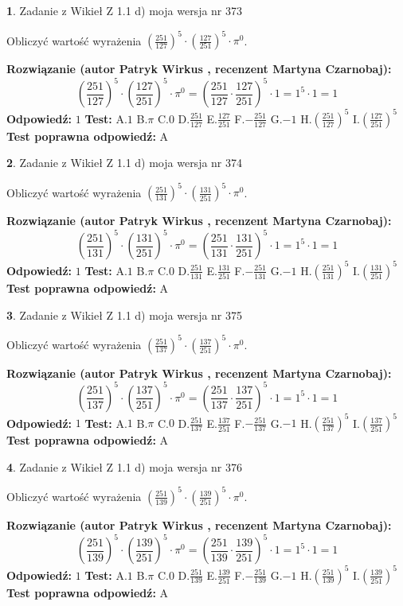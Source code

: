 \documentclass[12pt, a4paper]{article}
\theoremstyle{definition} %
\newtheorem{zad}{}
\newcommand{\zadStart}[1]{\begin{zad}#1\newline}
\newcommand{\zadStop}{\end{zad}}
\newcommand{\rozwStart}[2]{\noindent \textbf{Rozwiązanie (autor #1 , recenzent #2): }\newline}
\newcommand{\rozwStop}{\newline}
\newcommand{\odpStart}{\noindent \textbf{Odpowiedź:}\newline}
\newcommand{\odpStop}{\newline}
\newcommand{\testStart}{\noindent \textbf{Test:}\newline}
\newcommand{\testStop}{\newline}
\newcommand{\kluczStart}{\noindent \textbf{Test poprawna odpowiedź:}\newline}
\newcommand{\kluczStop}{\newline}
\begin{document}
\zadStart{Zadanie z Wikieł Z 1.1 d) moja wersja nr 373}

Obliczyć wartość wyrażenia $(\frac{251}{127})^{5} \cdot (\frac{127}{251})^{5} \cdot \pi^{0}$.
\zadStop
\rozwStart{Patryk Wirkus}{Martyna Czarnobaj}
$$(\frac{251}{127})^{5} \cdot (\frac{127}{251})^{5} \cdot \pi^{0} = (\frac{251}{127} \cdot \frac{127}{251})^{5} \cdot 1 = 1^{5} \cdot 1 = 1$$
\rozwStop
\odpStart
$1$
\odpStop
\testStart
A.$1$ B.$\pi$ C.$0$ D.$\frac{251}{127}$ E.$\frac{127}{251}$
F.$-\frac{251}{127}$ G.$-1$
H.$(\frac{251}{127})^{5}$
I.$(\frac{127}{251})^{5}$
\testStop
\kluczStart
A
\kluczStop



\zadStart{Zadanie z Wikieł Z 1.1 d) moja wersja nr 374}

Obliczyć wartość wyrażenia $(\frac{251}{131})^{5} \cdot (\frac{131}{251})^{5} \cdot \pi^{0}$.
\zadStop
\rozwStart{Patryk Wirkus}{Martyna Czarnobaj}
$$(\frac{251}{131})^{5} \cdot (\frac{131}{251})^{5} \cdot \pi^{0} = (\frac{251}{131} \cdot \frac{131}{251})^{5} \cdot 1 = 1^{5} \cdot 1 = 1$$
\rozwStop
\odpStart
$1$
\odpStop
\testStart
A.$1$ B.$\pi$ C.$0$ D.$\frac{251}{131}$ E.$\frac{131}{251}$
F.$-\frac{251}{131}$ G.$-1$
H.$(\frac{251}{131})^{5}$
I.$(\frac{131}{251})^{5}$
\testStop
\kluczStart
A
\kluczStop



\zadStart{Zadanie z Wikieł Z 1.1 d) moja wersja nr 375}

Obliczyć wartość wyrażenia $(\frac{251}{137})^{5} \cdot (\frac{137}{251})^{5} \cdot \pi^{0}$.
\zadStop
\rozwStart{Patryk Wirkus}{Martyna Czarnobaj}
$$(\frac{251}{137})^{5} \cdot (\frac{137}{251})^{5} \cdot \pi^{0} = (\frac{251}{137} \cdot \frac{137}{251})^{5} \cdot 1 = 1^{5} \cdot 1 = 1$$
\rozwStop
\odpStart
$1$
\odpStop
\testStart
A.$1$ B.$\pi$ C.$0$ D.$\frac{251}{137}$ E.$\frac{137}{251}$
F.$-\frac{251}{137}$ G.$-1$
H.$(\frac{251}{137})^{5}$
I.$(\frac{137}{251})^{5}$
\testStop
\kluczStart
A
\kluczStop



\zadStart{Zadanie z Wikieł Z 1.1 d) moja wersja nr 376}

Obliczyć wartość wyrażenia $(\frac{251}{139})^{5} \cdot (\frac{139}{251})^{5} \cdot \pi^{0}$.
\zadStop
\rozwStart{Patryk Wirkus}{Martyna Czarnobaj}
$$(\frac{251}{139})^{5} \cdot (\frac{139}{251})^{5} \cdot \pi^{0} = (\frac{251}{139} \cdot \frac{139}{251})^{5} \cdot 1 = 1^{5} \cdot 1 = 1$$
\rozwStop
\odpStart
$1$
\odpStop
\testStart
A.$1$ B.$\pi$ C.$0$ D.$\frac{251}{139}$ E.$\frac{139}{251}$
F.$-\frac{251}{139}$ G.$-1$
H.$(\frac{251}{139})^{5}$
I.$(\frac{139}{251})^{5}$
\testStop
\kluczStart
A
\kluczStop
\end{document}
